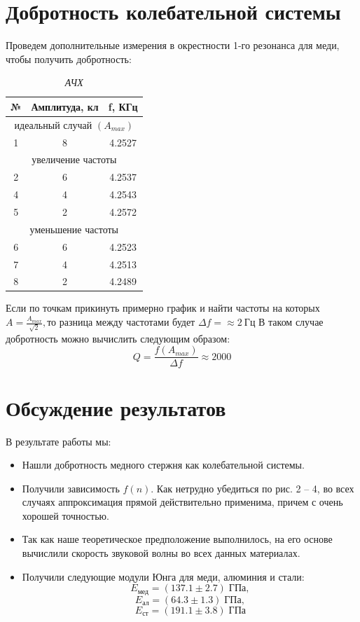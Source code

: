 \documentclass[a4paper, 10pt, twocolumn]{article}
\begin{document}
\section{Добротность колебательной системы}
 Проведем дополнительные измерения в окрестности 1-го резонанса
для меди, чтобы получить добротность:
\begin{table}[h]
    \centering
    \caption{\textit{АЧХ}}
    \label{tab:my_label}
    \begin{tabular}{|c|c|c|}
    \hline
    № & Амплитуда, кл & f, КГц \\ \hline
    \multicolumn{3}{c}{идеальный случай $(A_{max})$} \\ \hline
    1 & 8 & 4.2527 \\ \hline
    \multicolumn{3}{c}{увеличение частоты} \\ \hline
    2 & 6 & 4.2537 \\ \hline
    4 & 4 & 4.2543 \\ \hline
    5 & 2 & 4.2572 \\ \hline
    \multicolumn{3}{c}{уменьшение частоты} \\ \hline
    6 & 6 & 4.2523 \\ \hline
    7 & 4 & 4.2513 \\ \hline
    8 & 2 & 4.2489 \\ \hline
    \end{tabular}
\end{table}
Если по точкам прикинуть примерно график и найти частоты на которых $A = \frac{A_{max}}{\sqrt{2}}, \text{то разница между частотами будет } \Delta f = \approx 2~\text{Гц}$
В таком случае добротность можно вычислить следующим образом: $$ Q = \frac{f(A_{max})}{\Delta f} \approx 2000 $$

\section{Обсуждение результатов}
В результате работы мы:
\begin{itemize}
    \item Нашли добротность медного стержня как колебательной системы.

    \item Получили зависимость $f(n)$. Как нетрудно убедиться по рис. 2 -- 4,
    во всех случаях аппроксимация прямой действительно применима, причем с очень
    хорошей точностью.

    \item Так как наше теоретическое предположение выполнилось, на его основе
    вычислили скорость звуковой волны во всех данных материалах.

    \item Получили следующие модули Юнга для меди, алюминия и стали:
    $$ E_{\text{мед}} = (137.1\pm2.7)\;\text{ГПа}, $$
    $$ E_{\text{ал}}  = (64.3\pm1.3)\;\text{ГПа}, $$
    $$ E_{\text{ст}}   = (191.1\pm3.8)\;\text{ГПа} $$
\end{itemize}
\end{document}
